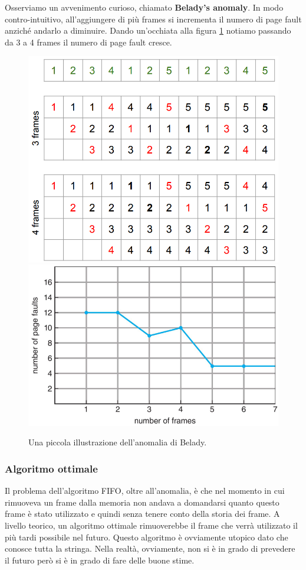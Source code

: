 Osserviamo un avvenimento curioso, chiamato \textbf{Belady's anomaly}. In modo contro-intuitivo, all'aggiungere di più frames si incrementa il numero di page fault anziché andarlo a diminuire. Dando un'occhiata alla figura \ref{fig:beladys} notiamo passando da 3 a 4 frames il numero di page fault cresce.
\begin{figure}[h]
    \centering
    \includegraphics[width = .40\textwidth]{../res/imgs/virtual memory/belady1.png}
    \includegraphics[width = .45\textwidth]{../res/imgs/virtual memory/belady2.png}
    \caption{Una piccola illustrazione dell'anomalia di Belady.}
    \label{fig:beladys}
\end{figure}

% 
\subsubsection{Algoritmo ottimale}
Il problema dell'algoritmo FIFO, oltre all'anomalia, è che nel momento in cui rimuoveva un frame dalla memoria non andava a domandarsi quanto questo frame è stato utilizzato e quindi senza tenere conto della storia dei frame. A livello teorico, un algoritmo ottimale rimuoverebbe il frame che verrà utilizzato il più tardi possibile nel futuro. Questo algoritmo è ovviamente utopico dato che conosce tutta la stringa. Nella realtà, ovviamente, non si è in grado di prevedere il futuro però si è in grado di fare delle buone stime.

